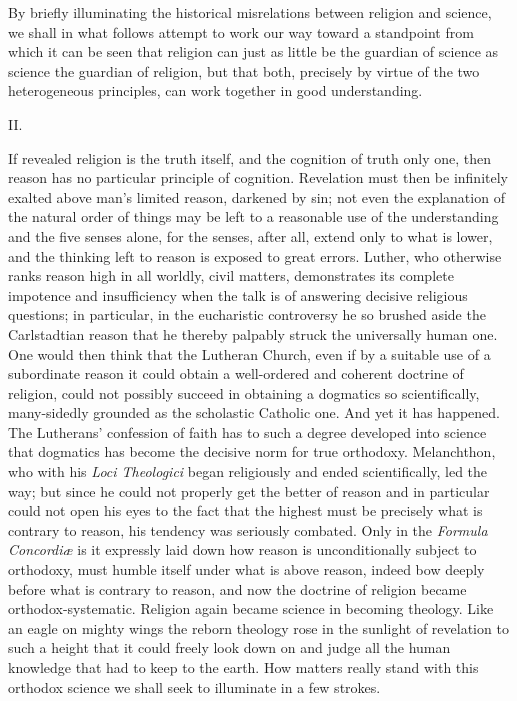\documentclass[12pt,a4paper]{article}
\newcommand{\opage}[1]{\marginnote{\footnotesize\textit{[#1]}}}
\begin{document}
By briefly illuminating the historical misrelations between
religion and science, we shall in what follows attempt to work
our way toward a standpoint from which it can be seen that religion can
just as little be the guardian of science as science the guardian of religion,
but that both, precisely by virtue of the two heterogeneous
principles, can work together in good understanding.

\begin{center}II.\end{center}

If revealed religion is the truth itself, and the cognition of truth
only one, then reason has no particular principle of cognition.
Revelation must then be infinitely exalted above man's limited reason,
darkened by sin; not even the explanation of the natural order of things
may be left to a reasonable use of the understanding and the five senses alone,
for the senses, after all, extend only to what is lower, and the thinking
left to reason is exposed to great errors. Luther, who otherwise ranks
reason high in all worldly, civil matters, demonstrates its
complete impotence and insufficiency when the talk is of
answering decisive religious questions; in particular, in the
eucharistic controversy he so brushed aside the Carlstadtian reason that he
thereby palpably struck the universally human one. One would then
think that the Lutheran Church, even if by a suitable use of
a subordinate reason it could obtain a well-ordered and coherent
doctrine of religion, could not possibly succeed in obtaining a dogmatics
so scientifically, many-sidedly grounded as the scholastic Catholic one.
And yet it has happened. The Lutherans' confession of faith has to such
a degree developed into science that dogmatics has become the decisive
\opage{18}norm for true orthodoxy. Melanchthon, who with his \textit{Loci
Theologici} began religiously and ended scientifically, led the way;
but since he could not properly get the better of reason and in particular
could not open his eyes to the fact that the highest must be precisely what is
contrary to reason, his tendency was seriously combated. Only
in the \textit{Formula Concordiæ} is it expressly laid down how reason
is unconditionally subject to orthodoxy, must humble itself under what is
above reason, indeed bow deeply before what is contrary to reason, and now
the doctrine of religion became orthodox-systematic. Religion again became
science in becoming theology. Like an eagle on mighty wings
the reborn theology rose in the sunlight of revelation to
such a height that it could freely look down on and judge all the
human knowledge that had to keep to the earth. How
matters really stand with this orthodox science we shall
seek to illuminate in a few strokes.
\end{document}
